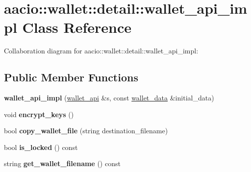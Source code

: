 \hypertarget{classaacio_1_1wallet_1_1detail_1_1wallet__api__impl}{}\section{aacio\+:\+:wallet\+:\+:detail\+:\+:wallet\+\_\+api\+\_\+impl Class Reference}
\label{classaacio_1_1wallet_1_1detail_1_1wallet__api__impl}


Collaboration diagram for aacio\+:\+:wallet\+:\+:detail\+:\+:wallet\+\_\+api\+\_\+impl\+:
\subsection*{Public Member Functions}
\begin{DoxyCompactItemize}
\item 
\mbox{\label{classaacio_1_1wallet_1_1detail_1_1wallet__api__impl_a62f7126b9e373461afabf06fc6853434}} 
{\bfseries wallet\+\_\+api\+\_\+impl} (\mbox{\hyperlink{classaacio_1_1wallet_1_1wallet__api}{wallet\+\_\+api}} \&s, const \mbox{\hyperlink{structaacio_1_1wallet_1_1wallet__data}{wallet\+\_\+data}} \&initial\+\_\+data)
\item 
\mbox{\label{classaacio_1_1wallet_1_1detail_1_1wallet__api__impl_acda93a8b70c7a852b0c5bca60bd74c0f}} 
void {\bfseries encrypt\+\_\+keys} ()
\item 
\mbox{\label{classaacio_1_1wallet_1_1detail_1_1wallet__api__impl_a16e7cbf6cd162395a30bd2e43749c8ca}} 
bool {\bfseries copy\+\_\+wallet\+\_\+file} (string destination\+\_\+filename)
\item 
\mbox{\label{classaacio_1_1wallet_1_1detail_1_1wallet__api__impl_a6eb0b9c070f83e8eba85ec7db7c1aed0}} 
bool {\bfseries is\+\_\+locked} () const
\item 
\mbox{\label{classaacio_1_1wallet_1_1detail_1_1wallet__api__impl_a309b20b1d6ad4d86f008d6977e4f6a23}} 
string {\bfseries get\+\_\+wallet\+\_\+filename} () const
\item 

\end{DoxyCompactItemize}
